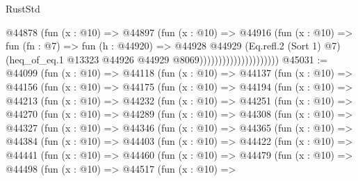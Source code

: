 \begin{lexlean}{RustStd}
\begin{coremodule}
                                    @44878
                                      (fun (x : @10) =>
                                      @44897
                                        (fun (x : @10) =>
                                        @44916
                                          (fun (x : @10) =>
                                          fun (fn : @7) =>
                                          fun (h : @44920) =>
                                          @44928
                                            @44929
                                            (Eq.refl.{2} (Sort 1) @7)
                                            (heq_of_eq.{1}
                                              @13323
                                              @44926
                                              @44929
                                              @8069)))))))))))))))))))))
@45031 := @44099
    (fun (x : @10) =>
    @44118
      (fun (x : @10) =>
      @44137
        (fun (x : @10) =>
        @44156
          (fun (x : @10) =>
          @44175
            (fun (x : @10) =>
            @44194
              (fun (x : @10) =>
              @44213
                (fun (x : @10) =>
                @44232
                  (fun (x : @10) =>
                  @44251
                    (fun (x : @10) =>
                    @44270
                      (fun (x : @10) =>
                      @44289
                        (fun (x : @10) =>
                        @44308
                          (fun (x : @10) =>
                          @44327
                            (fun (x : @10) =>
                            @44346
                              (fun (x : @10) =>
                              @44365
                                (fun (x : @10) =>
                                @44384
                                  (fun (x : @10) =>
                                  @44403
                                    (fun (x : @10) =>
                                    @44422
                                      (fun (x : @10) =>
                                      @44441
                                        (fun (x : @10) =>
                                        @44460
                                          (fun (x : @10) =>
                                          @44479
                                            (fun (x : @10) =>
                                            @44498
                                              (fun (x : @10) =>
                                              @44517
                                                (fun (x : @10) =>

\end{coremodule}
\end{lexlean}
